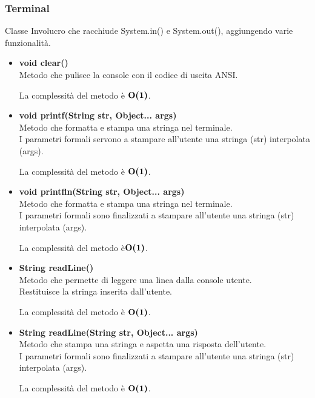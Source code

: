 \documentclass[a4paper, 12pt]{scrreprt}
\begin{document}
				\subsubsection{Terminal}
				Classe Involucro che racchiude System.in() e System.out(), aggiungendo varie funzionalit\`a.
				\begin{itemize}
					\item \textbf{void clear()}
					\\Metodo che pulisce la console con il codice di uscita ANSI.
					
					La complessit\`a del metodo \`e $\mathbf{O}\textbf{(1)}$.
					
					\item \textbf{void printf(String str, Object... args)}
					\\Metodo che formatta e stampa una stringa nel terminale.
					\\I parametri formali servono a stampare all'utente una stringa (str) interpolata (args).
					
					La complessit\`a del metodo \`e $\mathbf{O}\textbf{(1)}$.
					
					\item \textbf{void printfln(String str, Object... args)}
					\\Metodo che formatta e stampa una stringa nel terminale.
					\\I parametri formali sono finalizzati a stampare all'utente una stringa (str) interpolata (args).
					
					La complessit\`a del metodo \`e$\mathbf{O}\textbf{(1)}$.
					
					\item \textbf{String readLine()}
					\\Metodo che permette di leggere una linea dalla console utente.
					\\Restituisce la stringa inserita dall'utente.
					
					La complessit\`a del metodo \`e $\mathbf{O}\textbf{(1)}$.
					
					\item \textbf{String readLine(String str, Object... args)}
					\\Metodo che stampa una stringa e aspetta una risposta dell'utente.
					\\I parametri formali sono finalizzati a stampare all'utente una stringa (str) interpolata (args).
					
					La complessit\`a del metodo \`e $\mathbf{O}\textbf{(1)}$.
					

\end{itemize}
\end{document}
